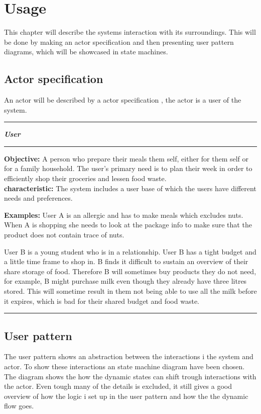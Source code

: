 \chapter{Usage}\label{Usage}
This chapter will describe the systems interaction with its surroundings. This will be done by making an actor specification and then presenting user pattern diagrams, which will be showcased in state machines.

\section{Actor specification}
\label{Actor_specification}
An actor will be described by a actor specification , the actor is a user of the system.

\hrule
\begin{tightcenter}
\textit{\textbf{User}}
\end{tightcenter}
\hrule
\textbf{Objective:} A person who prepare their meals them self, either for them self or for a family household. The user's primary need is to plan their week in order to efficiently shop their groceries and lessen food waste.\\

\textbf{characteristic:} The system includes a user base of which the users have different needs and preferences.

\textbf{Examples:} User A is an allergic and has to make meals which excludes nuts. When A is shopping she needs to look at the package info to make sure that the product does not contain trace of nuts.

User B is a young student who is in a relationship. User B has a tight budget and a little time frame to shop in. B finds it difficult to sustain an overview of their share storage of food. Therefore B will sometimes buy products they do not need, for example, B might purchase milk even though they already have three litres stored. This will sometime result in them not being able to use all the milk before it expires, which is bad for their shared budget and food waste.
\hrule



\section{User pattern}
The user pattern shows an abstraction between the interactions i the system and actor. To show these interactions an state machine diagram have been chosen. The diagram shows the how the dynamic states can shift trough interactions with the actor. Even tough many of the details is excluded, it still gives a good overview of how the logic i set up in the user pattern and how the the dynamic flow goes. 

